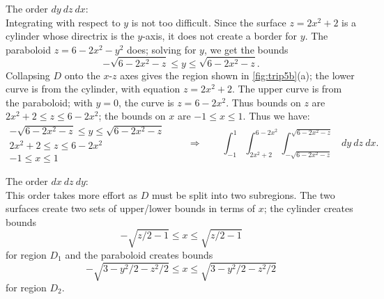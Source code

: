 \begin{example}
\noindent The order $dy\ dz\ dx$:\\

Integrating with respect to $y$ is not too difficult. Since the surface $z=2x^2+2$ is a cylinder whose directrix is the $y$-axis, it does not create a border for $y$. The paraboloid $z=6-2x^2-y^2$ does; solving for $y$, we get the bounds 
\[-\sqrt{6-2x^2-z}\leq y\leq \sqrt{6-2x^2-z}.\]
Collapsing $D$ onto the $x$-$z$ axes gives the region shown in \autoref{fig:trip5b}(a); the lower curve is from the cylinder, with equation $z=2x^2+2$. The upper curve is from the paraboloid; with $y=0$, the curve is $z=6-2x^2$. Thus bounds on $z$ are $2x^2+2\leq z\leq 6-2x^2$; the bounds on $x$ are $-1\leq x\leq 1$. Thus we have:
\[
	\begin{gathered}
		-\sqrt{6-2x^2-z}\leq y\leq \sqrt{6-2x^2-z}\\
		2x^2+2\leq z\leq 6-2x^2\\
		-1\leq x\leq 1
	\end{gathered}
	\qquad\Rightarrow\qquad
	\int_{-1}^1\int_{2x^2+2}^{6-2x^2}\int_{-\sqrt{6-2x^2-z}}^{\sqrt{6-2x^2-z}}\ dy\ dz\ dx.
\]


\noindent The order $dx\ dz\ dy$:\\

This order takes more effort as $D$ must be split into two subregions. The two surfaces create two sets of upper/lower bounds in terms of $x$; the cylinder creates bounds
\[-\sqrt{z/2-1}\leq x\leq \sqrt{z/2-1}\]
for region $D_1$  and the paraboloid creates bounds
\[-\sqrt{3-y^2/2-z^2/2}\leq x\leq \sqrt{3-y^2/2-z^2/2}\]
for region $D_2$.


\end{example}

